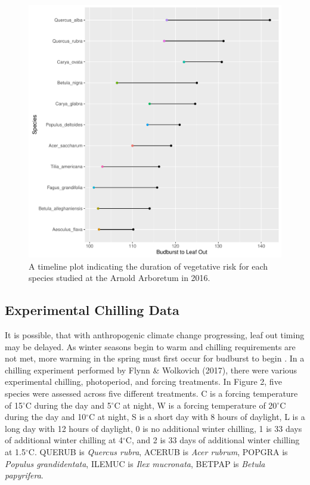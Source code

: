 \documentclass{article}\usepackage[]{graphicx}\usepackage[]{color}
\makeatletter
\def\maxwidth{ %
  \ifdim\Gin@nat@width>\linewidth
    \linewidth
  \else
    \Gin@nat@width
  \fi
}
\makeatother
\begin{document}
\begin{figure}[H]
\includegraphics[width=\maxwidth]{figure/treespotters-1} \caption[A timeline plot indicating the duration of vegetative risk for each species studied at the Arnold Arboretum in 2016]{A timeline plot indicating the duration of vegetative risk for each species studied at the Arnold Arboretum in 2016.}\label{fig:treespotters}
\end{figure}



\subsection{Experimental Chilling Data}
It is possible, that with anthropogenic climate change progressing, leaf out timing may be delayed. As winter seasons begin to warm and chilling requirements are not met, more warming in the spring must first occur for budburst to begin \citep{Polgar2014, Fu2012, Morin2009, McCreary1990}. In a chilling experiment performed by Flynn \& Wolkovich (2017), there were various experimental chilling, photoperiod, and forcing treatments. In Figure 2, five species were assessed across five different treatments. C is a forcing temperature of 15$^{\circ}$C during the day and 5$^{\circ}$C at night, W is a forcing temperature of 20$^{\circ}$C during the day and 10$^{\circ}$C at night, S is a short day with 8 hours of daylight, L is a long day with 12 hours of daylight, 0 is no additional winter chilling, 1 is 33 days of additional winter chilling at 4$^{\circ}$C, and 2 is 33 days of additional winter chilling at 1.5$^{\circ}$C. QUERUB is \textit{Quercus rubra}, ACERUB is \textit{Acer rubrum}, POPGRA is \textit{Populus grandidentata}, ILEMUC is \textit{Ilex mucronata}, BETPAP is \textit{Betula papyrifera}.
\end{document}
